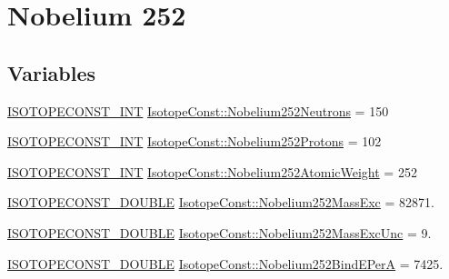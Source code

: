 \hypertarget{group___isotope_const-_nobelium-_no252}{}\section{Nobelium 252}
\label{group___isotope_const-_nobelium-_no252}
\subsection*{Variables}
\begin{DoxyCompactItemize}
\item 
\mbox{\hyperlink{group___isotope_const-_macros_ga5f18360b3e99483a35c32d789e62621c}{I\+S\+O\+T\+O\+P\+E\+C\+O\+N\+S\+T\+\_\+\+I\+NT}} \mbox{\hyperlink{group___isotope_const-_nobelium-_no252_ga81bacd24542fe0016b98fc4bee3a9186}{Isotope\+Const\+::\+Nobelium252\+Neutrons}} = 150
\item 
\mbox{\hyperlink{group___isotope_const-_macros_ga5f18360b3e99483a35c32d789e62621c}{I\+S\+O\+T\+O\+P\+E\+C\+O\+N\+S\+T\+\_\+\+I\+NT}} \mbox{\hyperlink{group___isotope_const-_nobelium-_no252_ga73631365b0c43696a09b5e6b1e7aaf0a}{Isotope\+Const\+::\+Nobelium252\+Protons}} = 102
\item 
\mbox{\hyperlink{group___isotope_const-_macros_ga5f18360b3e99483a35c32d789e62621c}{I\+S\+O\+T\+O\+P\+E\+C\+O\+N\+S\+T\+\_\+\+I\+NT}} \mbox{\hyperlink{group___isotope_const-_nobelium-_no252_ga7da0989004a0314dbf00461a2c1776a2}{Isotope\+Const\+::\+Nobelium252\+Atomic\+Weight}} = 252
\item 
\mbox{\hyperlink{group___isotope_const-_macros_ga8f45a7272ce02c0b4c65c44636ed719a}{I\+S\+O\+T\+O\+P\+E\+C\+O\+N\+S\+T\+\_\+\+D\+O\+U\+B\+LE}} \mbox{\hyperlink{group___isotope_const-_nobelium-_no252_gacd26c83107e8e4744e411dfc950d3c0e}{Isotope\+Const\+::\+Nobelium252\+Mass\+Exc}} = 82871.
\item 
\mbox{\hyperlink{group___isotope_const-_macros_ga8f45a7272ce02c0b4c65c44636ed719a}{I\+S\+O\+T\+O\+P\+E\+C\+O\+N\+S\+T\+\_\+\+D\+O\+U\+B\+LE}} \mbox{\hyperlink{group___isotope_const-_nobelium-_no252_ga3b16168a982264924c8e7dcf30ab726f}{Isotope\+Const\+::\+Nobelium252\+Mass\+Exc\+Unc}} = 9.
\item 
\mbox{\hyperlink{group___isotope_const-_macros_ga8f45a7272ce02c0b4c65c44636ed719a}{I\+S\+O\+T\+O\+P\+E\+C\+O\+N\+S\+T\+\_\+\+D\+O\+U\+B\+LE}} \mbox{\hyperlink{group___isotope_const-_nobelium-_no252_gafdc6108f1c5939e09467accf836c3759}{Isotope\+Const\+::\+Nobelium252\+Bind\+E\+PerA}} = 7425.
\item 

\end{DoxyCompactItemize}

